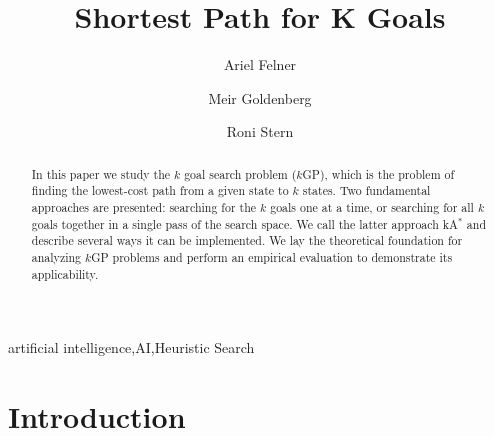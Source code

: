 \documentclass{aicom2e}
\newcommand{\kgs}{$k$GP}
\newcommand{\kastar}{kA$^*$}
\begin{document}
\begin{frontmatter}                           %
%
\title{Shortest Path for K Goals}
\maketitle
%
\author[]{Ariel Felner}
\address{Ben Gurion University of the Negev\\ Be'er Sheva, Israel\\
    E-mail: felner@bgu.ac.il}

\author[]{Meir Goldenberg}
\address{The Jerusalem College of Technology\\ Jerusalem, Israel\\
    E-mail: mgoldenbe@gmail.com}
\author[]{Roni Stern}
\address{Ben Gurion University of the Negev\\ Be'er Sheva, Israel\\
    E-mail: roni.stern@gmail.com}

\begin{abstract}
	In this paper we study the $k$ goal search problem (\kgs{}), 
	which is the problem of finding the lowest-cost path 
	from a given state to $k$ states. Two fundamental approaches 
	are presented: searching for the $k$ goals one at a time,
	or searching for all $k$ goals together in a single pass of the
	search space. We call the latter approach \kastar{} 
	and describe several ways it can be implemented. 
	We lay the theoretical foundation for analyzing \kgs{} problems
	and perform an empirical evaluation to demonstrate 
	its applicability. 
\end{abstract}

\begin{keyword}
artificial intelligence\sep AI\sep Heuristic Search
\end{keyword}
%
\end{frontmatter}

\section{Introduction}

\end{document}
